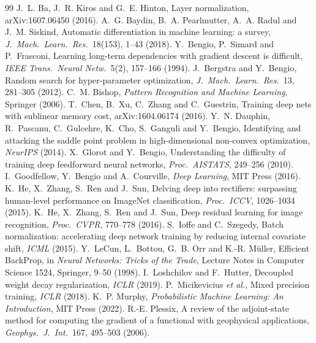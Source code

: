 \documentclass[11pt]{article}
\begin{document}
\begin{thebibliography}{99}\small
{} J.~L. Ba, J.~R. Kiros and G.~E. Hinton, Layer normalization, arXiv:1607.06450 (2016).
 A.~G. Baydin, B.~A. Pearlmutter, A.~A. Radul and J.~M. Siskind, Automatic differentiation in machine learning: a survey, \emph{J.\ Mach.\ Learn.\ Res.}\ 18(153), 1--43 (2018).
 Y.~Bengio, P.~Simard and P.~Frasconi, Learning long-term dependencies with gradient descent is difficult, \emph{IEEE Trans.\ Neural Netw.}\ 5(2), 157--166 (1994).
 J.~Bergstra and Y.~Bengio, Random search for hyper-parameter optimization, \emph{J.\ Mach.\ Learn.\ Res.}\ 13, 281--305 (2012).
 C.~M. Bishop, \emph{Pattern Recognition and Machine Learning}, Springer (2006).
 T.~Chen, B.~Xu, C.~Zhang and C.~Guestrin, Training deep nets with sublinear memory cost, arXiv:1604.06174 (2016).
 Y.~N. Dauphin, R.~Pascanu, C.~Gulcehre, K.~Cho, S.~Ganguli and Y.~Bengio, Identifying and attacking the saddle point problem in high-dimensional non-convex optimization, \emph{NeurIPS} (2014).
 X.~Glorot and Y.~Bengio, Understanding the difficulty of training deep feedforward neural networks, \emph{Proc.\ AISTATS}, 249--256 (2010).
 I.~Goodfellow, Y.~Bengio and A.~Courville, \emph{Deep Learning}, MIT Press (2016).
 K.~He, X.~Zhang, S.~Ren and J.~Sun, Delving deep into rectifiers: surpassing human-level performance on ImageNet classification, \emph{Proc.\ ICCV}, 1026--1034 (2015).
 K.~He, X.~Zhang, S.~Ren and J.~Sun, Deep residual learning for image recognition, \emph{Proc.\ CVPR}, 770--778 (2016).
 S.~Ioffe and C.~Szegedy, Batch normalization: accelerating deep network training by reducing internal covariate shift, \emph{ICML} (2015).
 Y.~LeCun, L.~Bottou, G.~B. Orr and K.-R. M\"uller, Efficient BackProp, in \emph{Neural Networks: Tricks of the Trade}, Lecture Notes in Computer Science 1524, Springer, 9--50 (1998).
 I.~Loshchilov and F.~Hutter, Decoupled weight decay regularization, \emph{ICLR} (2019).
 P.~Micikevicius \emph{et al.}, Mixed precision training, \emph{ICLR} (2018).
 K.~P. Murphy, \emph{Probabilistic Machine Learning: An Introduction}, MIT Press (2022).
 R.-E. Plessix, A review of the adjoint-state method for computing the gradient of a functional with geophysical applications, \emph{Geophys.\ J.\ Int.}\ 167, 495--503 (2006).

\end{thebibliography}
\end{document}
